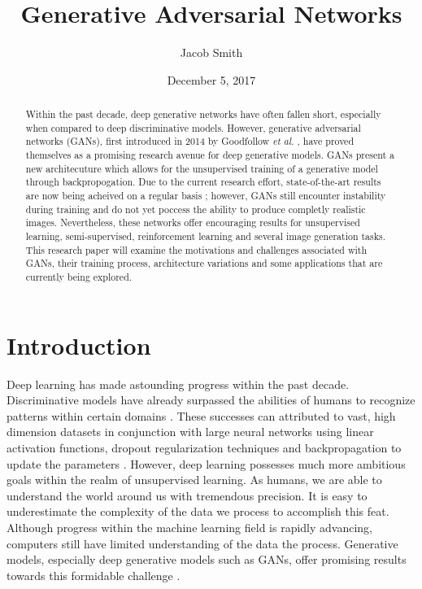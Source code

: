 \documentclass[11pt]{article}
\title{Generative Adversarial Networks}
\author{Jacob Smith}
\date{December 5, 2017}
\begin{document}
\maketitle

\begin{abstract}
    Within the past decade, deep generative networks have often fallen short, especially when compared to deep discriminative models. However, generative adversarial networks (GANs), first introduced in 2014 by Goodfollow \textit{et al.} \citep{2014arXiv1406.2661G}, have proved themselves as a promising research avenue for deep generative models. GANs present a new architecuture which allows for the unsupervised training of a generative model through backpropogation. Due to the current research effort, state-of-the-art results are now being acheived on a regular basis \citep{2017arXiv171010196K, 2017arXiv171111585W}; however, GANs still encounter instability during training and do not yet poccess the ability to produce completly realistic images. Nevertheless, these networks offer encouraging results for unsupervised learning, semi-supervised, reinforcement learning and several image generation tasks. This research paper will examine the motivations and challenges associated with GANs, their training process, architecture variations and some applications that are currently being explored.
\end{abstract}

\section{Introduction}
Deep learning has made astounding progress within the past decade. Discriminative models have already surpassed the abilities of humans to recognize patterns within certain domains \citep{2014arXiv1404.7828S}. These successes can attributed to vast, high dimension datasets in conjunction with large neural networks using linear activation functions, dropout regularization techniques and backpropagation to update the parameters \citep{2014arXiv1406.2661G}. However, deep learning possesses much more ambitious goals within the realm of unsupervised learning. As humans, we are able to understand the world around us with tremendous precision. It is easy to underestimate the complexity of the data we process to accomplish this feat. Although progress within the machine learning field is rapidly advancing, computers still have limited understanding of the data the process. Generative models, especially deep generative models such as GANs, offer promising results towards this formidable challenge \citep{genmodelingopenai}.
\end{document}
